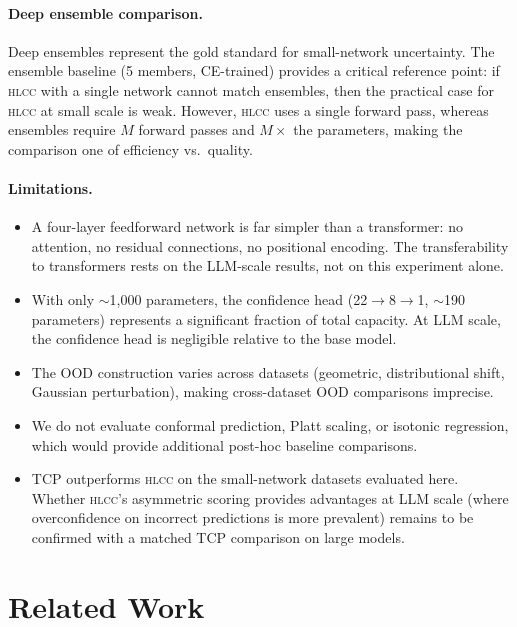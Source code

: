 \documentclass[11pt,a4paper]{article}
\newcommand{\hlcc}{\textsc{hlcc}}
\begin{document}
\paragraph{Deep ensemble comparison.}
Deep ensembles represent the gold standard for small-network
uncertainty.  The ensemble baseline (5 members, CE-trained) provides
a critical reference point: if \hlcc{} with a single network cannot
match ensembles, then the practical case for \hlcc{} at small scale
is weak.  However, \hlcc{} uses a single forward pass, whereas
ensembles require $M$ forward passes and $M\times$ the parameters,
making the comparison one of efficiency vs.\ quality.

\paragraph{Limitations.}
\begin{itemize}
  \item A four-layer feedforward network is far simpler than a
        transformer: no attention, no residual connections, no
        positional encoding.  The transferability to transformers
        rests on the LLM-scale results, not on this experiment alone.
  \item With only $\sim$1{,}000 parameters, the confidence head
        (22$\to$8$\to$1, $\sim$190 parameters) represents a
        significant fraction of total capacity.  At LLM scale, the
        confidence head is negligible relative to the base model.
  \item The OOD construction varies across datasets (geometric,
        distributional shift, Gaussian perturbation), making
        cross-dataset OOD comparisons imprecise.
  \item We do not evaluate conformal prediction, Platt scaling,
        or isotonic regression, which would provide additional
        post-hoc baseline comparisons.
  \item TCP outperforms \hlcc{} on the small-network datasets
        evaluated here.  Whether \hlcc{}'s asymmetric scoring
        provides advantages at LLM scale (where overconfidence
        on incorrect predictions is more prevalent) remains to be
        confirmed with a matched TCP comparison on large models.
\end{itemize}

\section{Related Work}
\label{sec:related}
\end{document}
